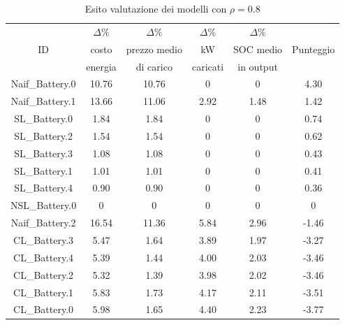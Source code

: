 \documentclass[italian, Lau, oneside]{sapthesis}
\begin{document}
\begin{table}[h]
    \center
    \caption{Esito valutazione dei modelli con $\rho = 0.8$}
    \label{tab:scen3}
    \begin{tabular}{c|c|c|c|c|c}
        \hline
        \hline
                & $\Delta \%$   & $\Delta \%$   & $\Delta \%$   & $\Delta \%$   &\\
        ID      & costo         & prezzo medio  & kW            & SOC medio     & Punteggio\\
                & energia       & di carico     & caricati      & in output     & \\

        \hline
        Naif\_Battery.0     & 10.76     & 10.76     & 0     & 0     & 4.30     \\
        \hline
        Naif\_Battery.1     & 13.66     & 11.06     & 2.92  & 1.48  & 1.42     \\
        \hline
        SL\_Battery.0       & 1.84      & 1.84      & 0     & 0     & 0.74      \\
        \hline
        SL\_Battery.2       & 1.54      & 1.54      & 0     & 0     & 0.62      \\
        \hline
        SL\_Battery.3       & 1.08      & 1.08      & 0     & 0     & 0.43      \\
        \hline
        SL\_Battery.1       & 1.01      & 1.01      & 0     & 0     & 0.41      \\
        \hline
        SL\_Battery.4       & 0.90      & 0.90      & 0     & 0     & 0.36      \\
        \hline
        NSL\_Battery.0      & 0         & 0         & 0     & 0     & 0         \\
        \hline
        Naif\_Battery.2     & 16.54     & 11.36     & 5.84  & 2.96  & -1.46     \\
        \hline
        CL\_Battery.3       & 5.47      & 1.64      & 3.89  & 1.97  & -3.27      \\
        \hline
        CL\_Battery.4       & 5.39      & 1.44      & 4.00  & 2.03  & -3.46      \\
        \hline
        CL\_Battery.2       & 5.32      & 1.39      & 3.98  & 2.02  & -3.46      \\
        \hline
        CL\_Battery.1       & 5.83      & 1.73      & 4.17  & 2.11  & -3.51      \\
        \hline
        CL\_Battery.0       & 5.98      & 1.65      & 4.40  & 2.23  & -3.77      \\
        \hline
        \hline
    \end{tabular}
\end{table}
\end{document}
